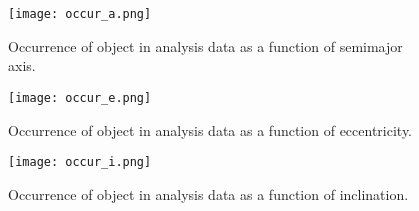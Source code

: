 \documentclass[iop,apj]{emulateapj}
\begin{document}
\begin{figure}[!htb]
    \centering
    \texttt{[image: occur\_a.png]}
    \caption{Occurrence of object in analysis data as a function of semimajor axis. }\label{fig:3}
\end{figure}

\begin{figure}[!htb]
    \centering
    \texttt{[image: occur\_e.png]}
    \caption{Occurrence of object in analysis data as a function of eccentricity. }\label{fig:4}
\end{figure}

\begin{figure}[!htb]
    \centering
    \texttt{[image: occur\_i.png]}
    \caption{Occurrence of object in analysis data as a function of inclination. }\label{fig:5}
\end{figure}
\end{document}
